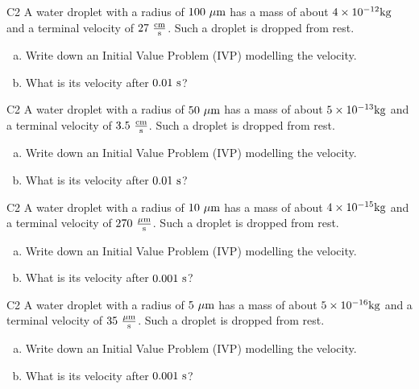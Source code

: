 \begin{problem}{C2}
A water droplet with a radius of \(100\ {\rm \mu m}\) has a mass of about \(4 \times 10^{-12} {\rm kg}\) and a terminal velocity of \(27\ {\rm \frac{cm}{s}}\).  Such a droplet is dropped from rest.  
\begin{enumerate}[(a)]
\item Write down an Initial Value Problem (IVP) modelling the velocity.
\item What is its velocity after \(0.01\ {\rm s}\)?
\end{enumerate}
\end{problem}

\begin{problem}{C2}
A water droplet with a radius of \(50\ {\rm \mu m}\) has a mass of about \(5 \times 10^{-13} {\rm kg}\) and a terminal velocity of \(3.5\ {\rm \frac{cm}{s}}\).  Such a droplet is dropped from rest.  
\begin{enumerate}[(a)]
\item Write down an Initial Value Problem (IVP) modelling the velocity.
\item What is its velocity after \(0.01\ {\rm s}\)?
\end{enumerate}
\end{problem}

\begin{problem}{C2}
A water droplet with a radius of \(10\ {\rm \mu m}\) has a mass of about \(4 \times 10^{-15} {\rm kg}\) and a terminal velocity of \(270 \ {\rm \frac{\mu m}{s}}\).  Such a droplet is dropped from rest.  
\begin{enumerate}[(a)]
\item Write down an Initial Value Problem (IVP) modelling the velocity.
\item What is its velocity after \(0.001\ {\rm s}\)?
\end{enumerate}
\end{problem}

\begin{problem}{C2}
A water droplet with a radius of \(5\ {\rm \mu m}\) has a mass of about \(5 \times 10^{-16} {\rm kg}\) and a terminal velocity of \(35 \ {\rm \frac{\mu m}{s}}\).  Such a droplet is dropped from rest.  
\begin{enumerate}[(a)]
\item Write down an Initial Value Problem (IVP) modelling the velocity.
\item What is its velocity after \(0.001\ {\rm s}\)?
\end{enumerate}
\end{problem}

